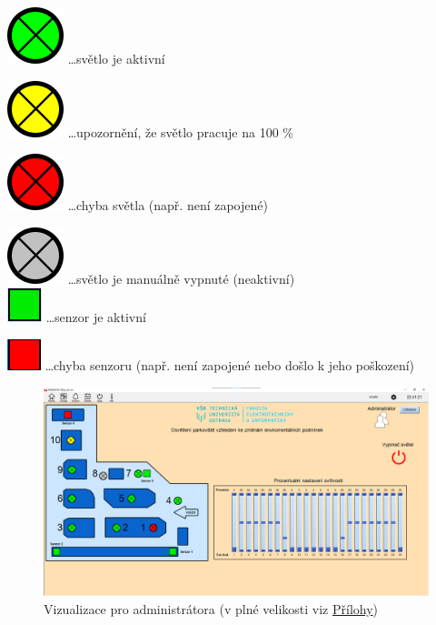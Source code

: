 \includegraphics[width=.04\textwidth]{Figures/zelene.png}
\dots světlo je aktivní

\includegraphics[width=.04\textwidth]{Figures/zlute.png}
\dots upozornění, že světlo pracuje na 100 \%

\includegraphics[width=.04\textwidth]{Figures/cervene.png}
\dots chyba světla (např. není zapojené)

\includegraphics[width=.04\textwidth]{Figures/sede.png}
\dots světlo je manuálně vypnuté (neaktivní) \\


\includegraphics[width=.04\textwidth]{Figures/senzor_zeleny.png}
\dots senzor je aktivní

\includegraphics[width=.04\textwidth]{Figures/senzor_cerveny.png}
\dots chyba senzoru (např. není zapojené nebo došlo k jeho poškození)


\begin{figure}[H]
    \centering\includegraphics[width=\textwidth]{Figures/PROMOTIC_admin_vizualizace.png}   
    \caption{Vizualizace pro administrátora (v plné velikosti viz \hyperref[Sec-Prilohy]{Přílohy})}
    \label{Obr-Viz_admin}
\end{figure}


